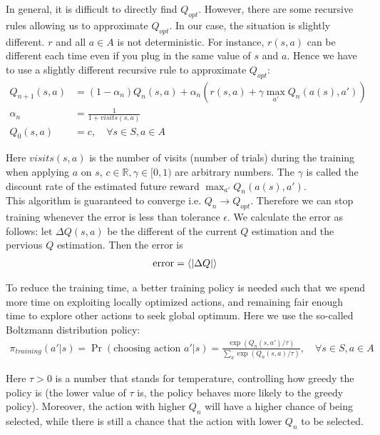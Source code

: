 \documentclass[11pt,a4paper]{article}
\numberwithin{equation}{section}
\newcommand{\R}{\mathbb{R}}
\newcommand{\inner}[1]{\left\langle #1 \right\rangle}
\begin{document}
In general, it is difficult to directly find $Q_{opt}$. However, there are some recursive rules allowing us to approximate $Q_{opt}$. In our case, the situation is slightly different. $r$ and all $a \in A$ is not deterministic. For instance, $r(s, a)$ can be different each time even if you plug in the same value of $s$ and $a$. Hence we have to use a slightly different recursive rule to approximate $Q_{opt}$:
\begin{align}
  Q_{n + 1} (s, a)
   & = (1 - \alpha_n) Q_n (s, a) + \alpha_n (r (s, a) + \gamma \max_{a'} Q_n (a(s), a')) \\
  \alpha_n
   & = \frac{1}{1 + visits(s, a)}                                                        \\
  Q_{0} (s, a)
   & = c, \quad \forall s \in S, a \in A
\end{align}

Here $visits(s, a)$ is the number of visits (number of trials) during the training when applying $a$ on $s$, $c \in \R, \gamma \in [0, 1)$ are arbitrary numbers. The $\gamma$ is called the discount rate of the estimated future reward $\max_{a'} Q_n (a(s), a')$. \\

This algorithm is guaranteed to converge i.e. $Q_n \to Q_{opt}$. Therefore we can stop training whenever the error is less than tolerance $\epsilon$. We calculate the error as follows: let $\Delta Q (s, a)$ be the different of the current $Q$ estimation and the pervious $Q$ estimation. Then the error is
\begin{align}
  \text{error} = \inner{\abs{\Delta Q}}
\end{align}

To reduce the training time, a better training policy is needed such that we spend more time on exploiting locally optimized actions, and remaining fair enough time to explore other actions to seek global optimum. Here we use the so-called Boltzmann distribution policy:
\begin{align}
  \pi_{training} (a'|s) = \Pr (\text{choosing action $a'$} | s)
  = \frac{\exp (Q_n(s, a') / \tau)}{\sum_a \exp (Q_n (s, a) / \tau)},
  \quad \forall s \in S, a \in A
\end{align}

Here $\tau > 0$ is a number that stands for temperature, controlling how greedy the policy is (the lower value of $\tau$ is, the policy behaves more likely to the greedy policy). Moreover, the action with higher $Q_n$ will have a higher chance of being selected, while there is still a chance that the action with lower $Q_n$ to be selected.
\end{document}

